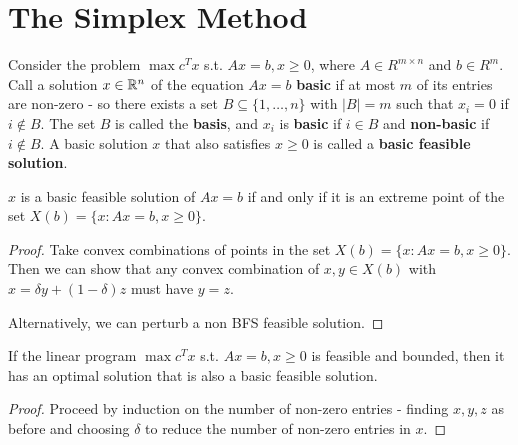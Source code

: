 \section{The Simplex Method}
\label{sec:simplex-method}

\begin{defn}
  \label{sec:simplex-method-2}
  Consider the problem $\max c^{T} x$ s.t. $Ax = b, x \geq 0$, where
  $A \in R^{m \times n}$ and $b \in R^{m}$.  Call a solution $x \in
  \mathbb{R}^{n}$ of the equation $Ax = b$ \textbf{basic} if at most $m$ of
  its entries are non-zero - so there exists a set $B \subseteq \{ 1,
  \dots, n \}$ with $|B| = m$ such that $x_{i} = 0$ if $i \notin B$.
  The set $B$ is called the \textbf{basis}, and $x_{i}$ is
  \textbf{basic} if $i \in B$ and \textbf{non-basic} if $i \notin B$.
  A basic solution $x$ that also satisfies $x \geq 0$ is called a
  \textbf{basic feasible solution}.
\end{defn}

\begin{thm}
  \label{sec:simplex-method-3}
  $x$ is a basic feasible solution of $Ax = b$ if and only if it is an
  extreme point of the set $X(b) = \{ x : Ax = b, x \geq 0 \} $.
\end{thm}

\begin{proof}
  Take convex combinations of points in the set $X(b) = \{ x: Ax = b,
  x \geq 0 \} $.  Then we can show that any convex combination of $x,
  y \in X(b)$ with $x = \delta y + (1 - \delta) z$ must have $y = z$.

  Alternatively, we can perturb a non BFS feasible solution.
\end{proof}

\begin{thm}
  \label{sec:simplex-method-4}
  If the linear program $\max c^{T} x$ s.t. $Ax = b, x \geq 0$ is
  feasible and bounded, then it has an optimal solution that is also a
  basic feasible solution.
\end{thm}

\begin{proof}
  Proceed by induction on the number of non-zero entries - finding $x,
  y, z$ as before and choosing $\delta$ to reduce the number of
  non-zero entries in $x$.
\end{proof}

